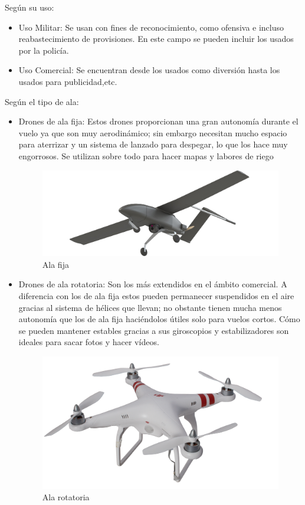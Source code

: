 Según su uso: 

\begin{itemize}
	\item Uso Militar: Se usan con fines de reconocimiento, como ofensiva e incluso reabastecimiento de provisiones. En este campo se pueden incluir los usados por la policía.
	\item Uso Comercial: Se encuentran desde los usados como diversión hasta los usados para publicidad,etc.
\end{itemize}

Según el tipo de ala:

\begin{itemize}
	\item Drones de ala fija: Estos drones proporcionan una gran autonomía durante el vuelo ya que son muy aerodinámico; sin embargo necesitan mucho espacio para aterrizar y un sistema de lanzado para despegar, lo que los hace muy engorrosos. Se utilizan sobre todo para hacer mapas y labores de riego
\begin{figure}[H]
	\center
	\includegraphics[scale=0.125]{imagenes/EstadodelArte/Alafija.png}
	\caption{Ala fija}
	\label{fig:Alafija}
\end{figure}
 
	\item Drones de ala rotatoria: Son los más extendidos en el ámbito comercial. A diferencia con los de ala fija estos pueden permanecer suspendidos en el aire gracias al sistema de hélices que llevan; no obstante tienen mucha menos autonomía que los de ala fija haciéndolos útiles solo para vuelos cortos. Cómo se pueden mantener estables gracias a sus giroscopios y estabilizadores son ideales para sacar fotos y hacer vídeos.
\begin{figure}[H]
	\center
	\includegraphics[scale=0.1]{imagenes/EstadodelArte/Alarotatoria.png}
	\caption{Ala rotatoria}
	\label{fig:Alarotatoria}
\end{figure}
 
\end{itemize}

